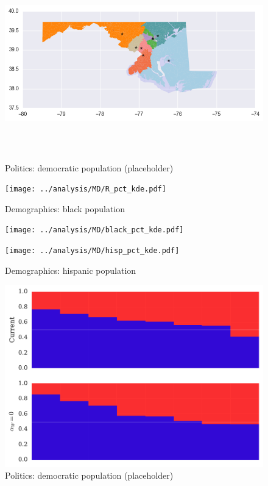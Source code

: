 \begin{figure}[htb!]
\includegraphics[width=5in,height=3in,keepaspectratio]{../maps/MD/static/0_25_after.png}
\end{figure}

\clearpage
\newpage

\begin{figure}[htb!] \centering
\caption{ Politics: democratic population (placeholder)}
\texttt{[image: ../analysis/MD/R\_pct\_kde.pdf]}
\caption{ Demographics: black population }
\texttt{[image: ../analysis/MD/black\_pct\_kde.pdf]}
\caption{ Demographics: hispanic population }
\texttt{[image: ../analysis/MD/hisp\_pct\_kde.pdf]}
\end{figure}

\clearpage
\newpage

\begin{figure}[htb!] \centering
\caption{ Politics: democratic population (placeholder)}
\includegraphics[width=6in]{../analysis/MD/barplot.pdf}
\end{figure}

